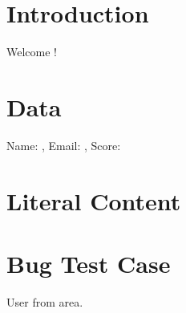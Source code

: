 \documentclass{article}
\newcommand{\blade}[1]{}
\begin{document}
\title{\blade{!! $title !!}}
\author{\blade{{ $author }}}
\date{\blade{{ $date }}}
\maketitle

\section{Introduction}
Welcome \blade{{ $user->name }}!

\section{Data}
Name: \blade{{ $user->name }}, Email: \blade{{ $user->email }}, Score: \blade{{ $user->score }}

\section{Literal Content}
\blade{This is literal content}

\section{Bug Test Case}
User from \textbf{\blade{{ $desa->kecamatan }}} area.
\end{document}
